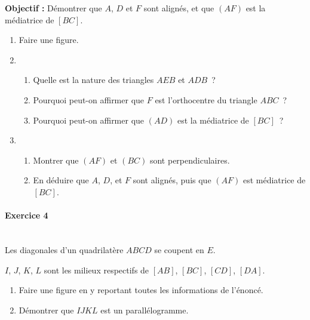 \documentclass[a4paper,11pt,twocolumn,landscape]{article}
\begin{document}
\begin{minipage}{0.45\textwidth}
\textbf{Objectif :} Démontrer que $A$, $D$ et $F$ sont alignés, et que $(AF)$ est la médiatrice de $[BC]$.
\begin{enumerate}
	\item Faire une figure.
	\item	\begin{enumerate} 
				\item Quelle est la nature des triangles $AEB$ et $ADB$~?
				\item Pourquoi peut-on affirmer que $F$ est l’orthocentre du triangle $ABC$~?
				\item Pourquoi peut-on affirmer que $(AD)$ est la médiatrice de $[BC]$~?
			\end{enumerate}
	\item	\begin{enumerate} 
				\item Montrer que $(AF)$ et $(BC)$ sont perpendiculaires.
				\item En déduire que $A$, $D$, et $F$ sont alignés, puis que $(AF)$ est médiatrice de $[BC]$.
			\end{enumerate}
\end{enumerate}

\paragraph*{Exercice 4}~\\

Les diagonales d’un quadrilatère $ABCD$ se coupent en $E$.

$I$, $J$, $K$, $L$ sont les milieux respectifs de $[AB]$, $[BC]$, $[CD]$, $[DA]$.

\begin{enumerate}
	\item Faire une figure en y reportant toutes les informations de l’énoncé.
	\item Démontrer que $IJKL$ est un parallélogramme.
\end{enumerate}



\end{minipage}
\end{document}
